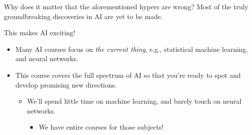 \documentclass[
  10pt,
  ignorenonframetext,
  aspectratio=1610,
]{ltx-talk}
\providecommand{\tightlist}{%
  \setlength{\itemsep}{0pt}\setlength{\parskip}{0pt}}
\begin{document}
\begin{frame}{Why does it matter that the aforementioned hypers are
wrong?}
\protect{}\label{why-does-it-matter-that-the-aforementioned-hypers-are-wrong}
Most of the truly groundbreaking discoveries in AI are yet to be made.

\vspace{.25in}
\begin{center}
\LARGE{This makes AI exciting!}
\end{center}

\begin{itemize}
\item
  Many AI courses focus on \emph{the current thing}, e.g., statistical
  machine learning, and neural networks.
\item
  This course covers the full spectrum of AI so that you're ready to
  spot and develop promising new directions.

  \begin{itemize}
  \item
    We'll spend little time on machine learning, and barely touch on
    neural networks.

    \begin{itemize}
    \tightlist
    \item
      We have entire courses for those subjects!
    \end{itemize}
  \end{itemize}
\end{itemize}
\end{frame}
\end{document}

